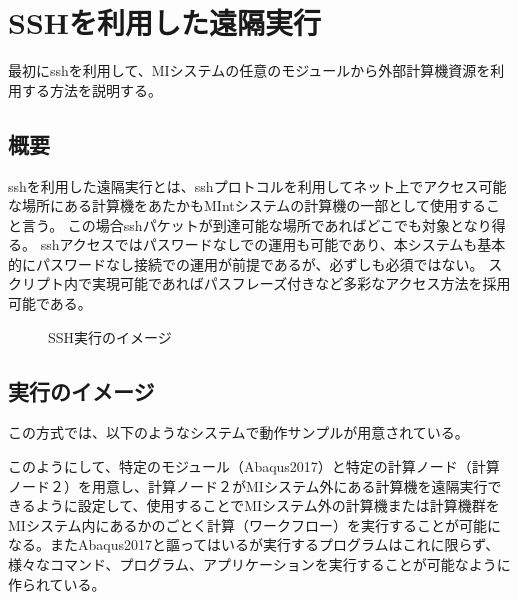 \documentclass[letterpaper,10pt,dvipdfmx,openany]{sphinxmanual}
\begin{document}
\section{SSHを利用した遠隔実行}
\label{\detokenize{using_distributed_properties:ssh}}
最初にsshを利用して、MIシステムの任意のモジュールから外部計算機資源を利用する方法を説明する。


\subsection{概要}
\label{\detokenize{using_distributed_properties:id4}}
sshを利用した遠隔実行とは、sshプロトコルを利用してネット上でアクセス可能な場所にある計算機をあたかもMIntシステムの計算機の一部として使用すること言う。
この場合sshパケットが到達可能な場所であればどこでも対象となり得る。
sshアクセスではパスワードなしでの運用も可能であり、本システムも基本的にパスワードなし接続での運用が前提であるが、必ずしも必須ではない。
スクリプト内で実現可能であればパスフレーズ付きなど多彩なアクセス方法を採用可能である。

\begin{figure}[htbp]
\centering
\capstart

\caption{SSH実行のイメージ}\label{\detokenize{using_distributed_properties:id43}}\end{figure}


\subsection{実行のイメージ}
\label{\detokenize{using_distributed_properties:id5}}
この方式では、以下のようなシステムで動作サンプルが用意されている。

\begin{figure}[htbp]
\centering

\noindent{}
\end{figure}



このようにして、特定のモジュール（Abaqus2017）と特定の計算ノード（計算ノード２）を用意し、計算ノード２がMIシステム外にある計算機を遠隔実行できるように設定して、使用することでMIシステム外の計算機または計算機群をMIシステム内にあるかのごとく計算（ワークフロー）を実行することが可能になる。またAbaqus2017と謳ってはいるが実行するプログラムはこれに限らず、様々なコマンド、プログラム、アプリケーションを実行することが可能なように作られている。
\end{document}
